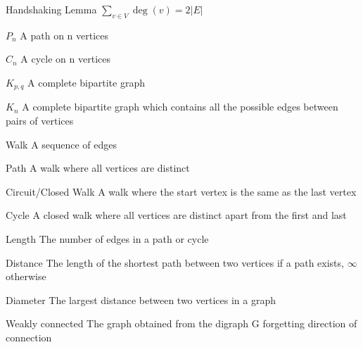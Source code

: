\documentclass[grid,avery5371]{flashcards}
\begin{document}
\begin{flashcard}[]{Handshaking Lemma}
	\(\sum_{v \in V} \operatorname{deg}(v)=2|E|\)
\end{flashcard}

\begin{flashcard}[]{$P_n$}
	A path on n vertices
\end{flashcard}

\begin{flashcard}[]{$C_n$}
	A cycle on n vertices
\end{flashcard}

\begin{flashcard}[]{$K_{p,q}$}
	A complete bipartite graph
\end{flashcard}
\begin{flashcard}[]{$K_n$}
	A complete bipartite graph which contains all the possible edges between pairs of vertices 
\end{flashcard}

\begin{flashcard}[]{Walk}
	A sequence of edges
\end{flashcard}

\begin{flashcard}[]{Path}
	A walk where all vertices are distinct
\end{flashcard}

\begin{flashcard}[]{Circuit/Closed Walk}
	A walk where the start vertex is the same as the last vertex
\end{flashcard}

\begin{flashcard}[]{Cycle}
	A closed walk where all vertices are distinct apart from the first and last
\end{flashcard}

\begin{flashcard}[]{Length}
	The number of edges in a path or cycle
\end{flashcard}

\begin{flashcard}[]{Distance}
	The length of the shortest path between two vertices if a path exists, $\infty$ otherwise
\end{flashcard}

\begin{flashcard}[]{Diameter}
	The largest distance between two vertices in a graph
\end{flashcard}

\begin{flashcard}[]{Weakly connected}
	The graph obtained from the digraph G forgetting direction of connection
\end{flashcard}
\end{document}

